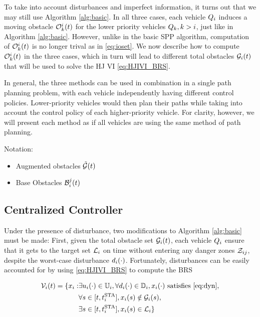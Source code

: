 To take into account disturbances and imperfect information, it turns out that we may still use Algorithm \ref{alg:basic}. In all three cases, each vehicle $Q_{i}$ induces a moving obstacle $\mathcal{O}_k^i(t)$ for the lower priority vehicles $Q_{k}, k>i$, just like in Algorithm \ref{alg:basic}. However, unlike in the basic SPP algorithm, computation of $\mathcal{O}_k^i(t)$ is no longer trival as in \eqref{eq:ioset}. We now describe how to compute $\mathcal{O}_k^i(t)$ in the three cases, which in turn will lead to different total obstacles $\mathcal{G}_i(t)$ that will be used to solve the HJ VI \eqref{eq:HJIVI_BRS}.

In general, the three methods can be used in combination in a single path planning problem, with each vehicle independently having different control policies. Lower-priority vehicles would then plan their paths while taking into account the control policy of each higher-priority vehicle. For clarity, however, we will present each method as if all vehicles are using the same method of path planning.

Notation:
\begin{itemize}
\item Augmented obstacles $\tilde{\mathcal{G}}(t)$
\item Base Obstacles $\mathcal{B}_i^j(t)$
\end{itemize}

\subsection{Centralized Controller} \label{sec:incomp_optctrl}
Under the presence of disturbance, two modifications to Algorithm \ref{alg:basic} must be made: First, given the total obstacle set $\mathcal{G}_i(t)$, each vehicle $Q_{i}$ ensure that it gets to the target set $\mathcal{L}_i$ on time without entering any danger zones $\mathcal{Z}_{ij}$, despite the worst-case disturbance $d_i(\cdot)$. Fortunately, disturbances can be easily accounted for by using \eqref{eq:HJIVI_BRS} to compute the BRS 

\begin{equation}
\label{eq:BRS_cc}
\begin{aligned}
\brs_i(t) = \{x_i: &\exists u_i(\cdot) \in \cfset_i, \forall d_i(\cdot) \in \dfset_i, x_i(\cdot) \text{ satisfies \eqref{eq:dyn}}, \\
&\forall s \in [t, \sta_i], x_i(s) \notin \obsset_i(s), \\
&\exists s \in [t, \sta_i], x_i(s) \in \targetset_i\}
\end{aligned}
\end{equation}


